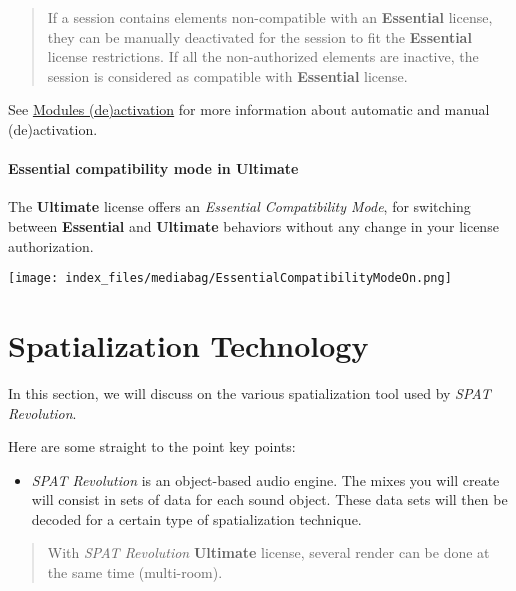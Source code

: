 \documentclass[
  letterpaper,
  DIV=11,
  numbers=noendperiod]{scrreport}
\providecommand{\tightlist}{%
  \setlength{\itemsep}{0pt}\setlength{\parskip}{0pt}}\usepackage{longtable,booktabs,array}
\begin{document}
\begin{quote}
If a session contains elements non-compatible with an \textbf{Essential}
license, they can be manually deactivated for the session to fit the
\textbf{Essential} license restrictions. If all the non-authorized
elements are inactive, the session is considered as compatible with
\textbf{Essential} license.
\end{quote}

See \href{Spat_Environment_Modules_de_activation.md}{Modules
(de)activation} for more information about automatic and manual
(de)activation.

\hypertarget{essential-compatibility-mode-in-ultimate}{%
\subsection{Essential compatibility mode in
Ultimate}\label{essential-compatibility-mode-in-ultimate}}

The \textbf{Ultimate} license offers an \emph{Essential Compatibility
Mode}, for switching between \textbf{Essential} and \textbf{Ultimate}
behaviors without any change in your license authorization.

\texttt{[image: index\_files/mediabag/EssentialCompatibilityModeOn.png]}

\part{Spatialization Technology}

In this section, we will discuss on the various spatialization tool used
by \emph{SPAT Revolution}.

Here are some straight to the point key points:

\begin{itemize}
\tightlist
\item
  \emph{SPAT Revolution} is an object-based audio engine. The mixes you
  will create will consist in sets of data for each sound object. These
  data sets will then be decoded for a certain type of spatialization
  technique.
\end{itemize}

\begin{quote}
With \emph{SPAT Revolution} \textbf{Ultimate} license, several render
can be done at the same time (multi-room).
\end{quote}
\end{document}
